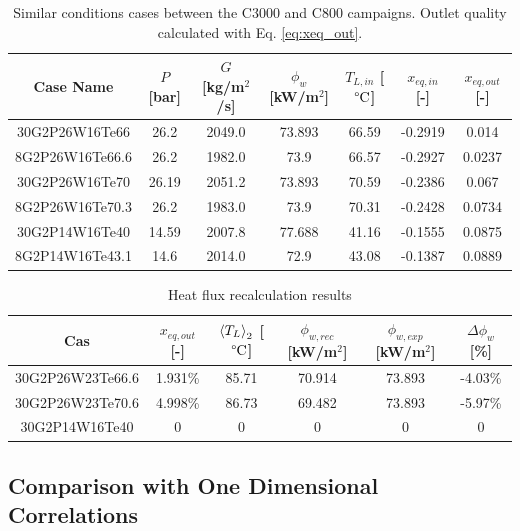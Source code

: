 \begin{table}[!h]
\centering

\begin{tabular}{c||c|c|c|c|c|c}
Case Name & $P$ [bar] & $G$ [kg/m$^{2}$/s]  & $\phi_{w}$ [kW/m$^{2}$]& $T_{L,in}$ [$\degree\mathrm{C}$] & $x_{eq,in}$ [-] & $x_{eq,out}$ [-] \\
\hline
\hline
30G2P26W16Te66  &  26.2  &  2049.0  &  73.893  &  66.59  &  -0.2919  &  0.014 \\
8G2P26W16Te66.6  &  26.2  &  1982.0  &  73.9  &  66.57  &  -0.2927  &  0.0237 \\
\hline 
30G2P26W16Te70  &  26.19  &  2051.2  &  73.893  &  70.59  &  -0.2386  &  0.067 \\
8G2P26W16Te70.3  &  26.2  &  1983.0  &  73.9  &  70.31  &  -0.2428  &  0.0734 \\
\hline
\hline
30G2P14W16Te40  &  14.59  &  2007.8  &  77.688  &  41.16  &  -0.1555  &  0.0875 \\
8G2P14W16Te43.1  &  14.6  &  2014.0  &  72.9  &  43.08  &  -0.1387  &  0.0889 \\
\end{tabular}

\caption{Similar conditions cases between the C3000 and C800 campaigns. Outlet quality calculated with Eq. \ref{eq:xeq_out}.}
\label{tab:debora_match_C8C30}
\end{table}




\begin{table}[!h]
\centering

\begin{tabular}{c||c|c|c|c|c}
\hline
Cas & $x_{eq,out}$ [-] & $\left< T_{L} \right>_{2}$ [$\degree\mathrm{C}$] & $\phi_{w,rec}$ [kW/m$^{2}$] & $\phi_{w,exp}$ [kW/m$^{2}$] & $\Delta \phi_{w}$ [\%]  \\
\hline
\hline
30G2P26W23Te66.6 & 1.931\% & 85.71 & 70.914 & 73.893 & -4.03\%\\
\hline
30G2P26W23Te70.6 & 4.998\% & 86.73 & 69.482 & 73.893 & -5.97\%\\
\hline
\hline
30G2P14W16Te40 & 0 & 0 & 0 & 0 & 0
\end{tabular}

\caption{Heat flux recalculation results}
\label{tab:debora_flux_corr_res}

\end{table}


\subsection{Comparison with One Dimensional Correlations}

